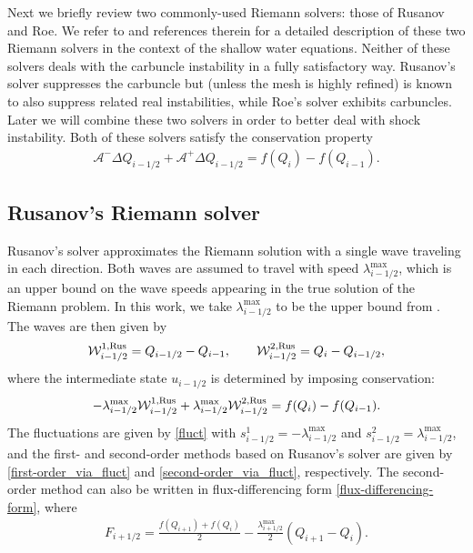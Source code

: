 \documentclass[preprint, 11pt]{article}
\newcommand{\W}{{\mathcal W}}
\newcommand{\A}{{\mathcal A}}
\newcommand{\apdq}{\A^+ \!\!{\Delta} Q}
\newcommand{\amdq}{\A^- \!\!{\Delta} Q}
\newcommand{\imh}{{i-1/2}}
\newcommand{\bff}{{f}}
\newcommand{\bfF}{{F}}
\newcommand{\bfu}{{u}}
\newcommand{\bfq}{{Q}}
\newcommand{\Rus}{{\rm Rus}}
\begin{document}
Next we briefly review two commonly-used Riemann solvers: those of Rusanov and
Roe.  We refer to \cite{ketcheson2020riemann} and references therein for
a detailed description of these two Riemann solvers in the context of
the shallow water equations.
Neither of these solvers deals with the carbuncle instability in a fully
satisfactory way.  Rusanov's solver suppresses the carbuncle but 
(unless the mesh is highly refined)
is known to
also suppress related real instabilities, while Roe's solver exhibits carbuncles.
Later we will combine these two solvers in order to better deal with shock instability.
Both of these solvers satisfy the conservation property
\begin{align} \label{rs_conservation}
    \amdq_\imh + \apdq_\imh = \bff(\bfq_i) - \bff(\bfq_{i-1}).
\end{align}


\subsection{Rusanov's Riemann solver}\label{sec:rusanov}
Rusanov's solver approximates the Riemann solution with a single wave traveling in each
direction.  Both waves are assumed to travel with speed $\lambda^{\max}_\imh$, which is an
upper bound on the wave speeds appearing in the true solution of the Riemann problem.
In this work, we take $\lambda_{i-1/2}^{\max}$ to be the upper bound
from \cite[Prop. 3.7]{azerad2017well}.
The waves are then given by
\begin{align}\label{rusanov_waves}
  \W_{i-1/2}^{1,\Rus}=\bfq_{i-1/2}-\bfq_{i-1}, \qquad
  \W_{i-1/2}^{2,\Rus}=\bfq_{i}-\bfq_{i-1/2},
\end{align}
where the intermediate state $\bfu_{i-1/2}$ is determined by imposing conservation:
\begin{align}\label{rus_cons}
  -\lambda_{i-1/2}^{\max}\W_{i-1/2}^{1,\Rus}+\lambda_{i-1/2}^{\max}\W_{i-1/2}^{2,\Rus} = \bff(\bfq_{i})-\bff(\bfq_{i-1}).
\end{align}
The fluctuations are given by \eqref{fluct} with $s_{i-1/2}^1=-\lambda_{i-1/2}^{\max}$
and $s_{i-1/2}^2=\lambda_{i-1/2}^{\max}$, and the first- and second-order methods based
on Rusanov's solver are given by \eqref{first-order_via_fluct} and \eqref{second-order_via_fluct}, respectively.
The second-order method can also be written in flux-differencing form \eqref{flux-differencing-form}, where 
\begin{align}\label{first-order_fluxes_LLF}
  \bfF_{i+1/2} = \frac{\bff(\bfq_{i+1})+\bff(\bfq_i)}{2}
  - \frac{\lambda_{i+1/2}^{\max}}{2}(\bfq_{i+1}-\bfq_{i}).
\end{align}
\end{document}
